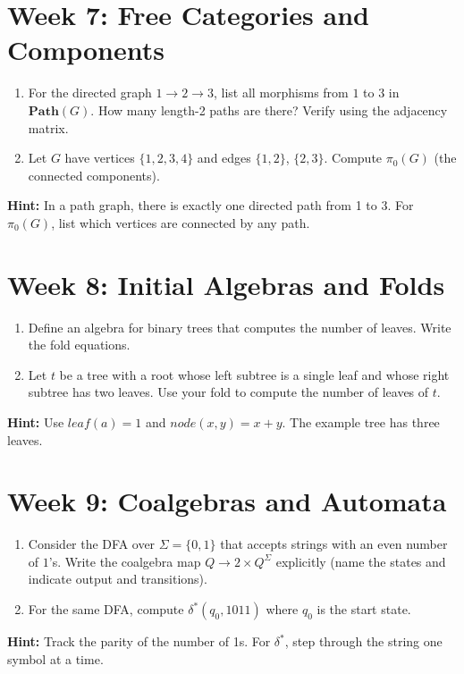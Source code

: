 \documentclass[11pt]{article}
\begin{document}
\section{Week 7: Free Categories and Components}
\begin{enumerate}[label=(\alph*)]
  \item For the directed graph $1 \to 2 \to 3$, list all morphisms from $1$ to $3$ in $\mathbf{Path}(G)$. How many length-2 paths are there? Verify using the adjacency matrix.
  \item Let $G$ have vertices $\{1,2,3,4\}$ and edges $\{1,2\}$, $\{2,3\}$. Compute $\pi_0(G)$ (the connected components).
\end{enumerate}
\textbf{Hint:} In a path graph, there is exactly one directed path from 1 to 3. For $\pi_0(G)$, list which vertices are connected by any path.

\section{Week 8: Initial Algebras and Folds}
\begin{enumerate}[label=(\alph*)]
  \item Define an algebra for binary trees that computes the number of leaves. Write the fold equations.
  \item Let $t$ be a tree with a root whose left subtree is a single leaf and whose right subtree has two leaves. Use your fold to compute the number of leaves of $t$.
\end{enumerate}
\textbf{Hint:} Use $\textit{leaf}(a)=1$ and $\textit{node}(x,y)=x+y$. The example tree has three leaves.

\section{Week 9: Coalgebras and Automata}
\begin{enumerate}[label=(\alph*)]
  \item Consider the DFA over $\Sigma = \{0,1\}$ that accepts strings with an even number of $1$'s. Write the coalgebra map $Q \to 2 \times Q^\Sigma$ explicitly (name the states and indicate output and transitions).
  \item For the same DFA, compute $\delta^*(q_0, 1011)$ where $q_0$ is the start state.
\end{enumerate}
\textbf{Hint:} Track the parity of the number of 1s. For $\delta^*$, step through the string one symbol at a time.
\end{document}

